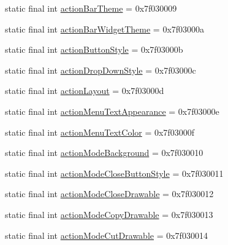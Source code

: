 \begin{DoxyCompactItemize}
\item 
static final int \mbox{\hyperlink{classandroid_1_1support_1_1v7_1_1appcompat_1_1_r_1_1attr_a730b542d613874043a93605d14257adc}{action\+Bar\+Theme}} = 0x7f030009
\item 
static final int \mbox{\hyperlink{classandroid_1_1support_1_1v7_1_1appcompat_1_1_r_1_1attr_a38efb70b29dc178a9221ab5cffb85285}{action\+Bar\+Widget\+Theme}} = 0x7f03000a
\item 
static final int \mbox{\hyperlink{classandroid_1_1support_1_1v7_1_1appcompat_1_1_r_1_1attr_a0d4d8a9b7b8fb3143b6a843205a9f6d4}{action\+Button\+Style}} = 0x7f03000b
\item 
static final int \mbox{\hyperlink{classandroid_1_1support_1_1v7_1_1appcompat_1_1_r_1_1attr_a37ef71784a4a5fc6bde80c5dcf0a8a4c}{action\+Drop\+Down\+Style}} = 0x7f03000c
\item 
static final int \mbox{\hyperlink{classandroid_1_1support_1_1v7_1_1appcompat_1_1_r_1_1attr_a6347993afb7f8044e8fbaed02bd0b158}{action\+Layout}} = 0x7f03000d
\item 
static final int \mbox{\hyperlink{classandroid_1_1support_1_1v7_1_1appcompat_1_1_r_1_1attr_a5669a423003bf4ce2aed058d2f975e0b}{action\+Menu\+Text\+Appearance}} = 0x7f03000e
\item 
static final int \mbox{\hyperlink{classandroid_1_1support_1_1v7_1_1appcompat_1_1_r_1_1attr_af8c52187b9d1bd133a1e912b7ef47dbe}{action\+Menu\+Text\+Color}} = 0x7f03000f
\item 
static final int \mbox{\hyperlink{classandroid_1_1support_1_1v7_1_1appcompat_1_1_r_1_1attr_a8c2ebe6be03afd4a0612b1194661d719}{action\+Mode\+Background}} = 0x7f030010
\item 
static final int \mbox{\hyperlink{classandroid_1_1support_1_1v7_1_1appcompat_1_1_r_1_1attr_a592d96e7b472b9e8bd6366bc29046d88}{action\+Mode\+Close\+Button\+Style}} = 0x7f030011
\item 
static final int \mbox{\hyperlink{classandroid_1_1support_1_1v7_1_1appcompat_1_1_r_1_1attr_a1c4edadd18a3dab9e013dae0ef8663b6}{action\+Mode\+Close\+Drawable}} = 0x7f030012
\item 
static final int \mbox{\hyperlink{classandroid_1_1support_1_1v7_1_1appcompat_1_1_r_1_1attr_aa21251f34b283b09f971b222e505f83e}{action\+Mode\+Copy\+Drawable}} = 0x7f030013
\item 
static final int \mbox{\hyperlink{classandroid_1_1support_1_1v7_1_1appcompat_1_1_r_1_1attr_a7a388f287426647bc512b667671c5dac}{action\+Mode\+Cut\+Drawable}} = 0x7f030014
\item 

\end{DoxyCompactItemize}
